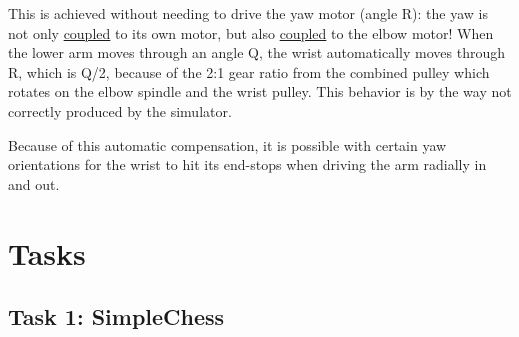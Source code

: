\documentclass[10pt]{scrartcl}
\begin{document}
This is achieved without needing to drive the yaw motor (angle R): the
yaw is not only \underline{coupled} to its own motor, but also
\underline{coupled} to the elbow motor! When the lower arm moves through
an angle Q, the wrist automatically moves through R, which is Q/2,
because of the 2:1 gear ratio from the combined pulley which rotates on
the elbow spindle and the wrist pulley. This behavior is by the way not
correctly produced by the simulator.

Because of this automatic compensation, it is possible with certain yaw
orientations for the wrist to hit its end-stops when driving the arm
radially in and out.

\section{Tasks}
\label{sec:Tasks}
\subsection{Task 1: SimpleChess}
\label{sec:SimpleChess}


\end{document}
